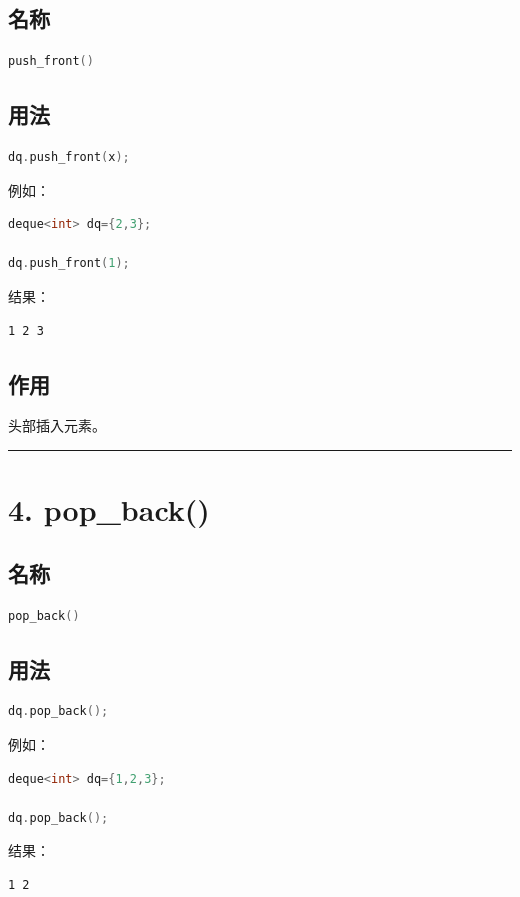 \documentclass[10pt,twocolumn]{extarticle}
\begin{document}
\subsection{名称}
\begin{lstlisting}[language=C++]
push_front()
\end{lstlisting}

\subsection{用法}
\begin{lstlisting}[language=C++]
dq.push_front(x);
\end{lstlisting}
例如：
\begin{lstlisting}[language=C++]
deque<int> dq={2,3};

dq.push_front(1);
\end{lstlisting}
结果：
\begin{lstlisting}
1 2 3
\end{lstlisting}

\subsection{作用}
头部插入元素。

\noindent\rule{\linewidth}{0.4pt}

\section{4. pop\_back()}

\subsection{名称}
\begin{lstlisting}[language=C++]
pop_back()
\end{lstlisting}

\subsection{用法}
\begin{lstlisting}[language=C++]
dq.pop_back();
\end{lstlisting}
例如：
\begin{lstlisting}[language=C++]
deque<int> dq={1,2,3};

dq.pop_back();
\end{lstlisting}
结果：
\begin{lstlisting}
1 2
\end{lstlisting}
\end{document}
